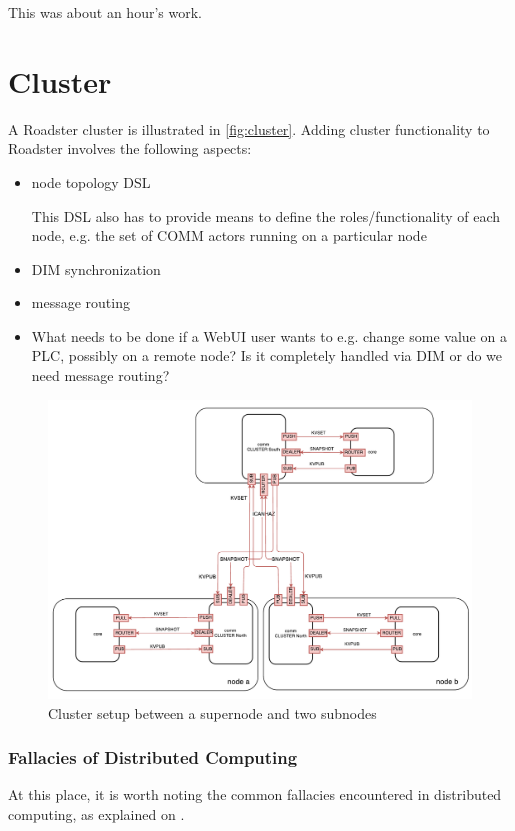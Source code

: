 This was about an hour's work.

\section{Cluster}\label{sec:meth:cluster}
A Roadster cluster is illustrated in \autoref{fig:cluster}. Adding cluster
functionality to Roadster involves the following aspects:
\begin{itemize}
	\item node topology DSL

		This DSL also has to provide means to define the roles/functionality of each node, e.g. the set of COMM actors running on a particular node

	\item DIM synchronization
	\item message routing
	\item What needs to be done if a WebUI user wants to e.g. change some value on a PLC, possibly on a remote node? Is it completely handled via DIM or do we need message routing?
\end{itemize}

\begin{figure}[]
	\includegraphics[width=\textwidth]{img/cluster_protocol.pdf}
	\caption{Cluster setup between a supernode and two subnodes}
	\label{fig:cluster}
\end{figure}

\subsubsection{Fallacies of Distributed Computing}
At this place, it is worth noting the common fallacies encountered in
distributed computing, as explained on \cite{dcomp:fallacies}.


